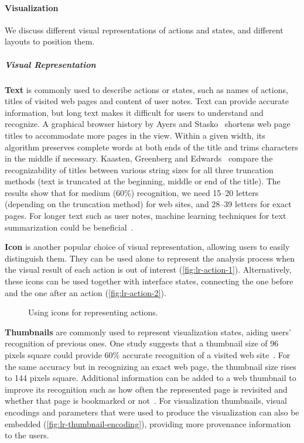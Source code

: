\paragraph{Visualization}
We discuss different visual representations of actions and states, and different layouts to position them.
 
\subparagraph{Visual Representation}
\textbf{Text} is commonly used to describe actions or states, such as names of actions, titles of visited web pages and content of user notes. Text can provide accurate information, but long text makes it difficult for users to understand and recognize. A graphical browser history by Ayers and Stasko~\cite{Ayers1995} shortens web page titles to accommodate more pages in the view. Within a given width, its algorithm preserves complete words at both ends of the title and trims characters in the middle if necessary. Kaasten, Greenberg and Edwards~\cite{Kaasten2001} compare the recognizability of titles between various string sizes for all three truncation methods (text is truncated at the beginning, middle or end of the title). The results show that for medium (60\%) recognition, we need 15--20 letters (depending on
the truncation method) for web sites, and 28--39 letters for
exact pages. For longer text such as user notes, machine learning techniques for text summarization could be beneficial~\cite{Nenkova2012}.

\textbf{Icon} is another popular choice of visual representation, allowing users to easily distinguish them. They can be used alone to represent the analysis process when the visual result of each action is out of interest (\autoref{fig:lr-action-1}). Alternatively, these icons can be used together with interface states, connecting the one before and the one after an action (\autoref{fig:lr-action-2}).

\begin{figure}[!htb]
\centering
{}

\vspace{.5\baselineskip}

\caption{Using icons for representing actions.}
\end{figure}

\textbf{Thumbnails} are commonly used to represent visualization states, aiding users' recognition of previous ones. One study suggests that a thumbnail size of 96 pixels square could provide 60\% accurate recognition of a visited web site~\cite{Kaasten2001}. For the same accuracy but in recognizing an exact web page, the thumbnail size rises to 144 pixels square. Additional information can be added to a web thumbnail to improve its recognition such as how often the represented page is revisited and whether that page is bookmarked or not~\cite{Cockburn1999}. For visualization thumbnails, visual encodings and parameters that were used to produce the visualization can also be embedded (\autoref{fig:lr-thumbnail-encoding}), providing more provenance information to the users.

